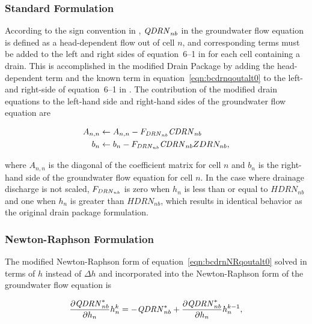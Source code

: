 \subsubsection{Standard Formulation}

According to the sign convention in \mf, $\mathit{QDRN}_{nb}$ in the groundwater flow equation is defined as a head-dependent flow out of cell $n$, and corresponding terms must be added to the left and right sides of equation~6--1 in \cite{modflow6gwf} for each cell containing a drain. This is accomplished in the modified Drain Package by adding the head-dependent term and the known term in equation~\ref{eqn:bcdrnqoutalt0} to the left- and right-side of equation~6--1 in \cite{modflow6gwf}. The contribution of the modified drain equations to the left-hand side and right-hand sides of the groundwater flow equation are

\begin{equation}
	\label{eqn:qdrnstd}
	\begin{aligned}
		A_{n,n} &\leftarrow A_{n,n} - F_{\mathit{DRN}_{nb}} \mathit{CDRN}_{nb}   \\
		b_n &\leftarrow b_n - F_{\mathit{DRN}_{nb}} \mathit{CDRN}_{nb} ZDRN_{nb} ,
	\end{aligned}
\end{equation} 

\noindent where $A_{n,n}$ is the diagonal of the coefficient matrix for cell $n$ and $b_n$ is the right-hand side of the groundwater flow equation for cell $n$. In the case where drainage discharge is not scaled, $F_{\mathit{DRN}_{nb}}$ is zero when $h_n$ is less than or equal to $HDRN_{nb}$ and one when $h_n$ is greater than $HDRN_{nb}$, which results in identical behavior as the original drain package formulation.


\subsubsection{Newton-Raphson Formulation}

The modified Newton-Raphson form of equation~\ref{eqn:bcdrnNRqoutalt0} solved in terms of $h$ instead of $\Delta h$  and incorporated into the Newton-Raphson form of the groundwater flow equation \citep[eq. 2--26]{modflow6gwf} is

\begin{equation}
	\label{eqn:nrQout}
	\frac{\partial \mathit{QDRN}_{nb}^*}{\partial h_n}  h^k_n  = - \mathit{QDRN}_{nb}^* + 
	\frac{\partial \mathit{QDRN}_{nb}^*}{\partial h_n}  h^{k-1}_n,
\end{equation} 

